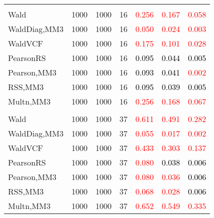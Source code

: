 \documentclass[
]{article}
\begin{document}
\begin{table}[H]
{\begin{tabular}[t]{lrrrrrr}
\addlinespace[0.3em]
\multicolumn{7}{l}{\textbf{2F 10V}}\\
\hspace{1em}Wald & 1000 & 1000 & 16 & \textcolor{red}{0.256} & \textcolor{red}{0.167} & \textcolor{red}{0.058}\\
\hspace{1em}WaldDiag,MM3 & 1000 & 1000 & 16 & \textcolor{red}{0.050} & \textcolor{red}{0.024} & \textcolor{red}{0.003}\\
\hspace{1em}WaldVCF & 1000 & 1000 & 16 & \textcolor{red}{0.175} & \textcolor{red}{0.101} & \textcolor{red}{0.028}\\
\hspace{1em}PearsonRS & 1000 & 1000 & 16 & \textcolor{black}{0.095} & \textcolor{black}{0.044} & \textcolor{black}{0.005}\\
\hspace{1em}Pearson,MM3 & 1000 & 1000 & 16 & \textcolor{black}{0.093} & \textcolor{black}{0.041} & \textcolor{red}{0.002}\\
\hspace{1em}RSS,MM3 & 1000 & 1000 & 16 & \textcolor{black}{0.095} & \textcolor{black}{0.039} & \textcolor{black}{0.005}\\
\hspace{1em}Multn,MM3 & 1000 & 1000 & 16 & \textcolor{red}{0.256} & \textcolor{red}{0.168} & \textcolor{red}{0.067}\\
\addlinespace[0.3em]
\multicolumn{7}{l}{\textbf{3F 15V}}\\
\hspace{1em}Wald & 1000 & 1000 & 37 & \textcolor{red}{0.611} & \textcolor{red}{0.491} & \textcolor{red}{0.282}\\
\hspace{1em}WaldDiag,MM3 & 1000 & 1000 & 37 & \textcolor{red}{0.055} & \textcolor{red}{0.017} & \textcolor{red}{0.002}\\
\hspace{1em}WaldVCF & 1000 & 1000 & 37 & \textcolor{red}{0.433} & \textcolor{red}{0.303} & \textcolor{red}{0.137}\\
\hspace{1em}PearsonRS & 1000 & 1000 & 37 & \textcolor{red}{0.080} & \textcolor{black}{0.038} & \textcolor{black}{0.006}\\
\hspace{1em}Pearson,MM3 & 1000 & 1000 & 37 & \textcolor{red}{0.080} & \textcolor{red}{0.036} & \textcolor{black}{0.006}\\
\hspace{1em}RSS,MM3 & 1000 & 1000 & 37 & \textcolor{red}{0.068} & \textcolor{red}{0.028} & \textcolor{black}{0.006}\\
\hspace{1em}Multn,MM3 & 1000 & 1000 & 37 & \textcolor{red}{0.652} & \textcolor{red}{0.549} & \textcolor{red}{0.335}\\
\bottomrule
\end{tabular}}
\endgroup{}
\end{table}
\end{document}
